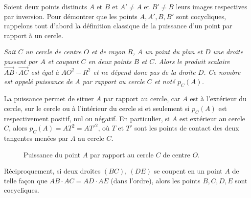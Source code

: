 \begin{exer}\label{exer:I3} Soient deux points distincts $A$ et $B$ et $A'\neq A$ et $B'\neq B$ leurs images respectives par inversion. Pour démontrer que les points $A,A', B,B'$ sont cocycliques, rappelons tout d'abord la définition classique de la puissance d'un point par rapport à un cercle.

\emph{Soit $C$ un cercle de centre $O$ et de rayon $R$, $A$ un point du plan et
$D$ une droite passant par $A$ et coupant $C$ en deux points $B$ et $C$. Alors le produit scalaire $\stackrel{\longrightarrow}{AB} \cdot \stackrel{\longrightarrow}{AC}$ est égal à $AO^2-R^2$ et ne dépend donc pas de la droite $D$. Ce nombre est appelé puissance de $A$ par rapport au cercle $C$ et noté $p_C(A)$.} 

La puissance permet de situer $A$ par rapport au cercle, car $A$ est à l'extérieur du cercle, sur le cercle ou à l'intérieur du cercle si et seulement si $p_C(A)$ est respectivement positif, nul ou négatif. En particulier, si $A$ est extérieur au cercle $C$, alors $p_C(A) = AT^2=AT'^2$, où $T$ et $T'$ sont les points de contact des deux tangentes menées par $A$ au cercle $C$.
 

\begin{figure}[ht]
\begin{center}
\shorthandoff{!}\shorthandoff{:}
\shorthandon{!}\shorthandoff{:}
\caption{Puissance du point $A$ par rapport au cercle $C$ de centre $O$.}\label{fig2}
\end{center}
\end{figure}
Réciproquement, si deux droites $(BC)$, $(DE)$ se coupent en un point $A$ de telle façon que $AB \cdot AC= AD \cdot AE$ (dans l'ordre), alors les points $B,C,D,E$ sont cocycliques. 


\end{exer}
